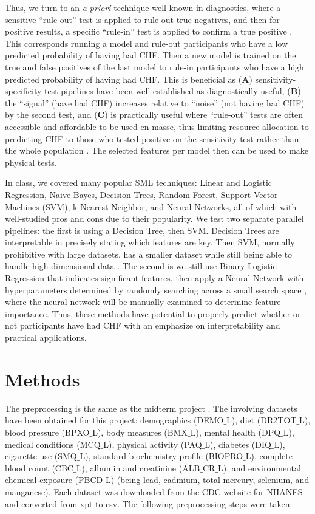 \documentclass{article}
\begin{document}
Thus, we turn to an \textit{a priori} technique well known in diagnostics, where a sensitive ``rule-out'' test is applied to rule out true negatives, and then for positive results, a specific ``rule-in'' test is applied to confirm a true positive \citep{SenSpec2017}. This corresponds running a model and rule-out participants who have a low predicted probability of having had CHF. Then a new model is trained on the true and false positives of the last model to rule-in participants who have a high predicted probability of having had CHF. This is beneficial as (\textbf{A}) sensitivity-specificity test pipelines have been well established as diagnostically useful, (\textbf{B}) the ``signal'' (have had CHF) increases relative to ``noise'' (not having had CHF) by the second test, and (\textbf{C}) is practically useful where ``rule-out'' tests are often accessible and affordable to be used en-masse, thus limiting resource allocation to predicting CHF to those who tested positive on the sensitivity test rather than the whole population \citep{SenSpec2017}. The selected features per model then can be used to make physical tests.

In class, we covered many popular SML techniques: Linear and Logistic Regression, Naive Bayes, Decision Trees, Random Forest, Support Vector Machines (SVM), k-Nearest Neighbor, and Neural Networks, all of which with well-studied pros and cons due to their popularity. We test two separate parallel pipelines: the first is using a Decision Tree, then SVM. Decision Trees are interpretable in precisely stating which features are key. Then SVM, normally prohibitive with large datasets, has a smaller dataset while still being able to handle high-dimensional data \citep{SML2025}. The second is we still use Binary Logistic Regression that indicates significant features, then apply a Neural Network with hyperparameters determined by randomly searching across a small search space \citep{NN2025}, where the neural network will be manually examined to determine feature importance. Thus, these methods have potential to properly predict whether or not participants have had CHF with an emphasize on interpretability and practical applications.

\vspace{-6mm}
\section*{Methods}
\vspace{-6mm}

The preprocessing is the same as the midterm project \citep{Midterm2026}. The involving datasets have been obtained for this project: demographics (DEMO$\_$L), diet (DR2TOT$\_$L), blood pressure (BPXO$\_$L), body measures (BMX$\_$L), mental health (DPQ$\_$L), medical conditions (MCQ$\_$L), physical activity (PAQ$\_$L), diabetes (DIQ$\_$L), cigarette use (SMQ$\_$L), standard biochemistry profile (BIOPRO$\_$L), complete blood count (CBC$\_$L), albumin and creatinine (ALB$\_$CR$\_$L), and environmental chemical exposure (PBCD$\_$L) (being lead, cadmium, total mercury, selenium, and manganese). Each dataset was downloaded from the CDC website for NHANES and converted from xpt to csv. The following preprocessing steps were taken:
\end{document}
